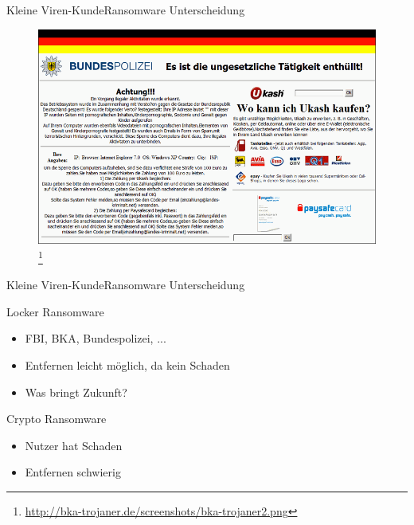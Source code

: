 \documentclass[notes,10pt]{beamer}
\begin{document}
\begin{frame}{Kleine Viren-Kunde}{Ransomware Unterscheidung}

	\begin{figure}[p]
		\centering
		\includegraphics[scale=0.25]{bka-trojaner.png}
		\let\thefootnote\relax\footnote{\url{http://bka-trojaner.de/screenshots/bka-trojaner2.png}}
	\end{figure}

\end{frame}

\begin{frame}{Kleine Viren-Kunde}{Ransomware Unterscheidung}
	\begin{block}{Locker Ransomware}
		\begin{itemize}
			\item FBI, BKA, Bundespolizei, ...
			\item Entfernen leicht möglich, da kein Schaden
			\item Was bringt Zukunft?
	   	\end{itemize}
	\end{block}
 	\begin{block}{Crypto Ransomware}
	  	\begin{itemize}
			\item Nutzer hat Schaden
			\item Entfernen schwierig
	   	\end{itemize}
  	\end{block}

\end{frame}
\end{document}
